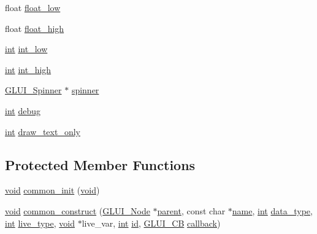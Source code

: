 \begin{DoxyCompactItemize}
\item 
float \hyperlink{class_g_l_u_i___edit_text_ac7f609e99bd8732d5026c7f57d5c8cd9}{float\+\_\+low}
\item 
float \hyperlink{class_g_l_u_i___edit_text_abb9f58f751bb995c3c8e52dc5c085bfd}{float\+\_\+high}
\item 
\hyperlink{wglext_8h_a500a82aecba06f4550f6849b8099ca21}{int} \hyperlink{class_g_l_u_i___edit_text_a99eb694c9998c637125763cdd91b2280}{int\+\_\+low}
\item 
\hyperlink{wglext_8h_a500a82aecba06f4550f6849b8099ca21}{int} \hyperlink{class_g_l_u_i___edit_text_abd03f72719e48cadb42bb4b297b378f4}{int\+\_\+high}
\item 
\hyperlink{class_g_l_u_i___spinner}{G\+L\+U\+I\+\_\+\+Spinner} $\ast$ \hyperlink{class_g_l_u_i___edit_text_a3d459f1fc60af26ac844283a87599a08}{spinner}
\item 
\hyperlink{wglext_8h_a500a82aecba06f4550f6849b8099ca21}{int} \hyperlink{class_g_l_u_i___edit_text_ad6006ae65e038eb60f011c8c7200b9ea}{debug}
\item 
\hyperlink{wglext_8h_a500a82aecba06f4550f6849b8099ca21}{int} \hyperlink{class_g_l_u_i___edit_text_aa6044d58c37fd18e9b5e83a153cfd108}{draw\+\_\+text\+\_\+only}
\end{DoxyCompactItemize}
\subsection*{Protected Member Functions}
\begin{DoxyCompactItemize}
\item 
\hyperlink{wglext_8h_a9e6b7f1933461ef318bb000d6bd13b83}{void} \hyperlink{class_g_l_u_i___edit_text_a3378e23e1470293a4758f729b899cae1}{common\+\_\+init} (\hyperlink{wglext_8h_a9e6b7f1933461ef318bb000d6bd13b83}{void})
\item 
\hyperlink{wglext_8h_a9e6b7f1933461ef318bb000d6bd13b83}{void} \hyperlink{class_g_l_u_i___edit_text_a35813da027699537c43e39912c3d77cd}{common\+\_\+construct} (\hyperlink{class_g_l_u_i___node}{G\+L\+U\+I\+\_\+\+Node} $\ast$\hyperlink{class_g_l_u_i___node_a8ed65d447784f6f88bd3e2e2bcac6cdb}{parent}, const char $\ast$\hyperlink{glext_8h_ad977737dfc9a274a62741b9500c49a32}{name}, \hyperlink{wglext_8h_a500a82aecba06f4550f6849b8099ca21}{int} \hyperlink{class_g_l_u_i___edit_text_a790a6e20d384d0f2eb4f9d4014aa9f95}{data\+\_\+type}, \hyperlink{wglext_8h_a500a82aecba06f4550f6849b8099ca21}{int} \hyperlink{class_g_l_u_i___control_a8ba7cae809a47dd870592aa2cc85483b}{live\+\_\+type}, \hyperlink{wglext_8h_a9e6b7f1933461ef318bb000d6bd13b83}{void} $\ast$live\+\_\+var, \hyperlink{wglext_8h_a500a82aecba06f4550f6849b8099ca21}{int} \hyperlink{glext_8h_a58c2a664503e14ffb8f21012aabff3e9}{id}, \hyperlink{class_g_l_u_i___c_b}{G\+L\+U\+I\+\_\+\+C\+B} \hyperlink{class_g_l_u_i___control_a96060fe0cc6d537e736dd6eef78e24ab}{callback})
\end{DoxyCompactItemize}
